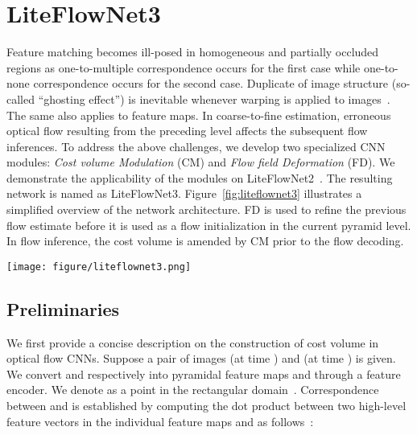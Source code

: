 \documentclass[runningheads]{llncs}
\begin{document}
\section{LiteFlowNet3}
Feature matching becomes ill-posed in homogeneous and partially occluded regions as one-to-multiple correspondence occurs for the first case while one-to-none correspondence occurs for the second case. Duplicate of image structure (so-called ``ghosting effect'') is inevitable whenever warping is applied to images~\cite{Janai18}. The same also applies to feature maps. In coarse-to-fine estimation, erroneous optical flow resulting from the preceding level affects the subsequent flow inferences.
To address the above challenges, we develop two specialized CNN modules: \textit{Cost volume Modulation} (CM) and \textit{Flow field Deformation} (FD). We demonstrate the applicability of the modules on LiteFlowNet2~\cite{Hui20}. The resulting network is named as LiteFlowNet3. Figure~\ref{fig:liteflownet3} illustrates a simplified overview of the network architecture.
FD is used to refine the previous flow estimate before it is used as a flow initialization in the current pyramid level.
In flow inference, the cost volume is amended by CM prior to the flow decoding. 

\begin{figure*}[t]
\centering
   \texttt{[image: figure/liteflownet3.png]}
\caption{(a) A simplified overview of LiteFlowNet3. Flow field deformation (FD) and cost volume modulation (CM) together with confidence maps are incorporated into LiteFlowNet3. For the ease of presentation, only a 2-level encoder-decoder structure is shown. The proposed modules are applicable to other levels but not limited to level 1. (b) The optical flow inference in LiteFlowNet2~\cite{Hui20}.}
\label{fig:liteflownet3}
\end{figure*}

\subsection{Preliminaries}
We first provide a concise description on the construction of cost volume in optical flow CNNs. Suppose a pair of images  (at time ) and  (at time ) is given. We convert  and  respectively into pyramidal feature maps  and  through a feature encoder. We denote  as a point in the rectangular domain~.  
Correspondence between  and  is established by computing the dot product between two high-level feature vectors in the individual feature maps  and  as follows~\cite{Dosovitskiy15}:
\end{document}
